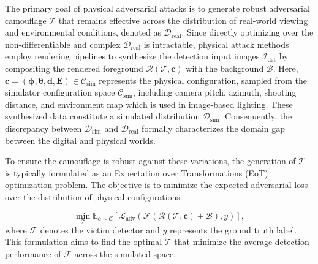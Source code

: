 \documentclass[10pt,journal,compsoc]{IEEEtran}
\begin{document}
The primary goal of physical adversarial attacks is to generate robust adversarial camouflage $\bm{\mathcal{T}}$ that remains effective across the distribution of real-world viewing and environmental conditions, denoted as $\mathcal{D}_{\text{real}}$.
Since directly optimizing over the non-differentiable and complex $\mathcal{D}_{\text{real}}$ is intractable, physical attack methods employ rendering pipelines to synthesize the detection input images $\mathcal{I}_{\text{det}}$ by compositing the rendered foreground $\mathcal{R}(\bm{\mathcal{T}}, \bm{c})$ with the background $\mathcal{B}$.
Here, $\bm{c}=(\bm{\phi},\bm{\theta},\bm{d},\bm{E})\in\mathcal{C}_{\text{sim}}$ represents the physical configuration, sampled from the simulator configuration space $\mathcal{C}_{\text{sim}}$, including camera pitch, azimuth, shooting distance, and environment map which is used in image-based lighting.
These synthesized data constitute a simulated distribution $\mathcal{D}_{\text{sim}}$.
Consequently, the discrepancy between $\mathcal{D}_{\text{sim}}$ and $\mathcal{D}_{\text{real}}$ formally characterizes the domain gap between the digital and physical worlds.

To ensure the camouflage is robust against these variations, the generation of $\bm{\mathcal{T}}$ is typically formulated as an Expectation over Transformations (EoT) optimization problem. 
The objective is to minimize the expected adversarial loss over the distribution of physical configurations:

\begin{equation}
\min_{\bm{\mathcal{T}}} \mathbb{E}_{\bm{c} \sim \mathcal{C}} \left[ \mathcal{L}_{\text{adv}}(\mathcal{F}(\mathcal{R}(\bm{\mathcal{T}},\bm{c})+\mathcal{B}), y) \right],
\label{eq:standard_eot}
\end{equation}
where $\mathcal{F}$ denotes the victim detector and $y$ represents the ground truth label.
This formulation aims to find the optimal $\bm{\mathcal{T}}$ that minimize the average detection performance of $\mathcal{F}$ across the simulated space.
\end{document}
